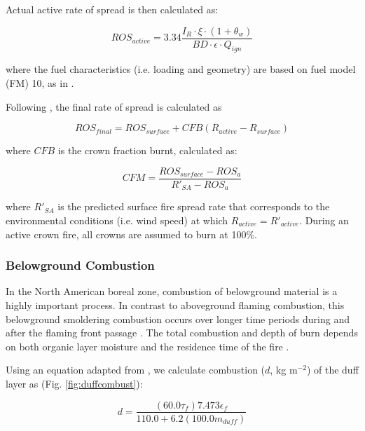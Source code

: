 \documentclass[a4paper, 12pt] {report}
\begin{document}
Actual active rate of spread is then calculated as:

\begin{equation} 
	ROS_{active} = 3.34\frac{I_R \cdot \xi \cdot (1 + \theta_w)}{BD \cdot \epsilon \cdot Q_{ign}}
\end{equation}

where the fuel characteristics (i.e.  loading and geometry) are based on fuel model (FM) 10,  as in . 

Following , the final rate of spread is calculated as 

\begin{equation}
	ROS_{final} = ROS_{surface} + CFB(R_{active} - R_{surface})
\end{equation}

where $CFB$ is the crown fraction burnt,  calculated as:


\begin{equation}
	CFM = \frac{ROS_{surface} - ROS_a}{R'_{SA} - ROS_a}
\end{equation}

where $R'_{SA}$ is the predicted surface fire spread rate that corresponds to the environmental conditions (i.e. wind speed) at which $R_{active} = R'_{active}$.  During an active crown fire, all crowns are assumed to burn at 100\%.

\subsubsection{Belowground Combustion}

In the North American boreal zone, combustion of belowground material is a highly important process. In contrast to aboveground flaming combustion, this belowground smoldering combustion occurs over longer time periods during and after the flaming front passage \cite{johnsonFireVegetationDynamics1992}. The total combustion and depth of burn depends on both organic layer moisture and the residence time of the fire \cite{johnsonFireVegetationDynamics1992, vanwagnerDuffConsumptionFire1972}.

Using an equation adapted from , we calculate combustion ($d$, kg m$^{-2}$) of the duff layer as (Fig. \ref{fig:duffcombust}):

\begin{equation}
	d = \frac{(60.0\tau_f)7.473\epsilon_f}{110.0 + 6.2(100.0m_{duff})}
\end{equation}
\end{document}
